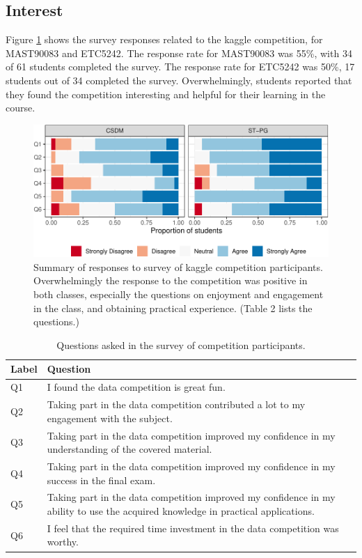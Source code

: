 \documentclass[12pt]{article}
\begin{document}
\subsection{Interest}\label{interest-1}

Figure \ref{fig:likert} shows the survey responses related to the kaggle
competition, for MAST90083 and ETC5242. The response rate for MAST90083
was 55\%, with 34 of 61 students completed the survey. The response rate
for ETC5242 was 50\%, 17 students out of 34 completed the survey.
Overwhelmingly, students reported that they found the competition
interesting and helpful for their learning in the course.

\begin{figure}
\centering
\includegraphics{paper-kaggle_files/figure-latex/likert-1.pdf}
\caption{\label{fig:likert}Summary of responses to survey of kaggle
competition participants. Overwhelmingly the response to the competition
was positive in both classes, especially the questions on enjoyment and
engagement in the class, and obtaining practical experience. (Table 2
lists the questions.)}
\end{figure}

\begin{table}[h]
\begin{center}
\begin{tabular}{|l|p{15cm}|}\hline
Label & Question \\\hline
Q1 & I found the data competition is great fun.\\\hline
Q2 & Taking part in the data competition contributed a lot to my engagement with the subject.\\\hline
Q3 & Taking part in the data competition improved my confidence in my understanding of the covered material.\\\hline
Q4 & Taking part in the data competition improved my confidence in my success in the final exam.\\\hline
Q5 & Taking part in the data competition improved my confidence in my ability to use the acquired knowledge in practical applications.\\\hline
Q6 & I feel that the required time investment in the data competition was worthy. \\\hline
\end{tabular}
\end{center}
\caption{Questions asked in the survey of competition participants.}
\label{survey_Q}
\end{table}
\end{document}
